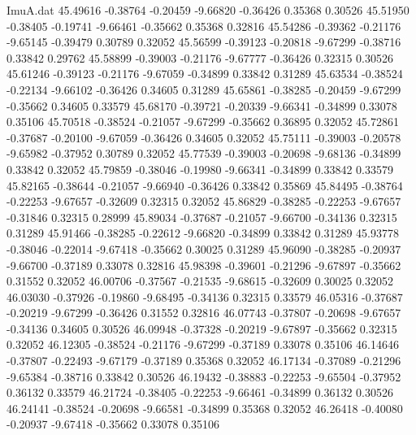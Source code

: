 \begin{filecontents}{ImuA.dat}
  45.49616   -0.38764   -0.20459   -9.66820   -0.36426    0.35368    0.30526
  45.51950   -0.38405   -0.19741   -9.66461   -0.35662    0.35368    0.32816
  45.54286   -0.39362   -0.21176   -9.65145   -0.39479    0.30789    0.32052
  45.56599   -0.39123   -0.20818   -9.67299   -0.38716    0.33842    0.29762
  45.58899   -0.39003   -0.21176   -9.67777   -0.36426    0.32315    0.30526
  45.61246   -0.39123   -0.21176   -9.67059   -0.34899    0.33842    0.31289
  45.63534   -0.38524   -0.22134   -9.66102   -0.36426    0.34605    0.31289
  45.65861   -0.38285   -0.20459   -9.67299   -0.35662    0.34605    0.33579
  45.68170   -0.39721   -0.20339   -9.66341   -0.34899    0.33078    0.35106
  45.70518   -0.38524   -0.21057   -9.67299   -0.35662    0.36895    0.32052
  45.72861   -0.37687   -0.20100   -9.67059   -0.36426    0.34605    0.32052
  45.75111   -0.39003   -0.20578   -9.65982   -0.37952    0.30789    0.32052
  45.77539   -0.39003   -0.20698   -9.68136   -0.34899    0.33842    0.32052
  45.79859   -0.38046   -0.19980   -9.66341   -0.34899    0.33842    0.33579
  45.82165   -0.38644   -0.21057   -9.66940   -0.36426    0.33842    0.35869
  45.84495   -0.38764   -0.22253   -9.67657   -0.32609    0.32315    0.32052
  45.86829   -0.38285   -0.22253   -9.67657   -0.31846    0.32315    0.28999
  45.89034   -0.37687   -0.21057   -9.66700   -0.34136    0.32315    0.31289
  45.91466   -0.38285   -0.22612   -9.66820   -0.34899    0.33842    0.31289
  45.93778   -0.38046   -0.22014   -9.67418   -0.35662    0.30025    0.31289
  45.96090   -0.38285   -0.20937   -9.66700   -0.37189    0.33078    0.32816
  45.98398   -0.39601   -0.21296   -9.67897   -0.35662    0.31552    0.32052
  46.00706   -0.37567   -0.21535   -9.68615   -0.32609    0.30025    0.32052
  46.03030   -0.37926   -0.19860   -9.68495   -0.34136    0.32315    0.33579
  46.05316   -0.37687   -0.20219   -9.67299   -0.36426    0.31552    0.32816
  46.07743   -0.37807   -0.20698   -9.67657   -0.34136    0.34605    0.30526
  46.09948   -0.37328   -0.20219   -9.67897   -0.35662    0.32315    0.32052
  46.12305   -0.38524   -0.21176   -9.67299   -0.37189    0.33078    0.35106
  46.14646   -0.37807   -0.22493   -9.67179   -0.37189    0.35368    0.32052
  46.17134   -0.37089   -0.21296   -9.65384   -0.38716    0.33842    0.30526
  46.19432   -0.38883   -0.22253   -9.65504   -0.37952    0.36132    0.33579
  46.21724   -0.38405   -0.22253   -9.66461   -0.34899    0.36132    0.30526
  46.24141   -0.38524   -0.20698   -9.66581   -0.34899    0.35368    0.32052
  46.26418   -0.40080   -0.20937   -9.67418   -0.35662    0.33078    0.35106

\end{filecontents}
